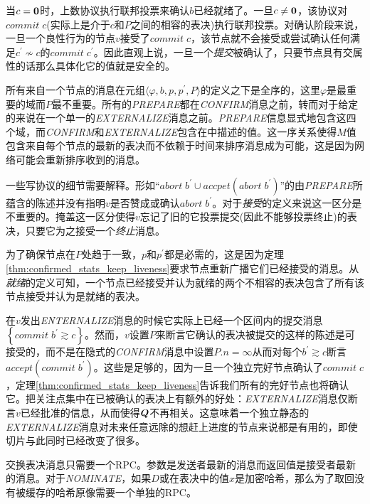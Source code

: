 当$c={\bm 0}$时，上数协议执行联邦投票来确认$b$已经就绪了。一旦$c\neq {\bm 0}$，该协议对$commit\;c$(实际上是介于$c$和$P$之间的相容的表决)执行联邦投票。对确认阶段来说，一旦一个良性行为的节点$v$接受了$commit\;c$，该节点就不会接受或尝试确认任何满足$c^{\prime}\not\sim c$的$commit\;c^{\prime}$。因此直观上说，一旦一个\textit{提交}被确认了，只要节点具有{\quorum}交属性的话那么具体化它的值就是安全的。

所有来自一个节点的消息在元组$\langle \varphi,b,p,p^{\prime},P\rangle$的定义之下是全序的，这里$\varphi$是最重要的域而$P$最不重要。所有的\textsl{PREPARE}都在\textsl{CONFIRM}消息之前，转而对于给定的{\slot}来说在一个单一的\textsl{EXTERNALIZE}消息之前。\textsl{PREPARE}信息显式地包含这四个域，而\textsl{CONFIRM}和\textsl{EXTERNALIZE}包含在中描述的值。这一序关系使得$M$值包含来自每个节点的最新的表决而不依赖于时间来排序消息成为可能，这是因为网络可能会重新排序收到的消息。

一些写协议的细节需要解释。形如``$abort\;b^{\prime}\cup accpet(abort\;b^{\prime})$''的由\textsl{PREPARE}所蕴含的陈述并没有指明$v$是否赞成或确认$abort\;b^{\prime}$。对于\textit{接受}的定义来说这一区分是不重要的。掩盖这一区分使得$v$忘记了旧的它投票提交(因此不能够投票终止)的表决，只要它为之接受一个\textit{终止}消息。

为了确保节点在$P$处趋于一致，$p$和$p^{\prime}$都是必需的，这是因为定理\ref{thm:confirmed_stats_keep_liveness}要求节点重新广播它们已经接受的消息。从\textit{就绪}的定义可知，一个节点已经接受并认为就绪的两个不相容的表决包含了所有该节点接受并认为是就绪的表决。

在$v$发出\textsl{ENTERNALIZE}消息的时候它实际上已经一个区间内的提交消息$\left\{commit \; b^{\prime}\gtrsim c\right\}$。然而，$v$设置$P$来断言它确认的表决被提交的这样的陈述是可接受的，而不是在隐式的\textsl{CONFIRM}消息中设置$P.n=\infty$从而对每个$b^{\prime}\gtrsim c$断言$accept(commit\;b^{\prime})$。这些是足够的，因为一旦一个独立完好节点确认了$commit\;c$，定理\ref{thm:confirmed_stats_keep_liveness}告诉我们所有的完好节点也将确认它。把关注点集中在已被确认的表决上有额外的好处：\textsl{EXTERNALIZE}消息仅断言$v$已经批准的信息，从而使得${\bm Q}$不再相关。这意味着一个独立静态的\textsl{EXTERNALIZE}消息对未来任意远除的想赶上进度的节点来说都是有用的，即使{\quorum}切片与此同时已经改变了很多。

交换表决消息只需要一个RPC。参数是发送者最新的消息而返回值是接受者最新的消息。对于\textsl{NOMINATE}，如果$D$或在表决中的值$x$是加密哈希，那么为了取回没有被缓存的哈希原像需要一个单独的RPC。